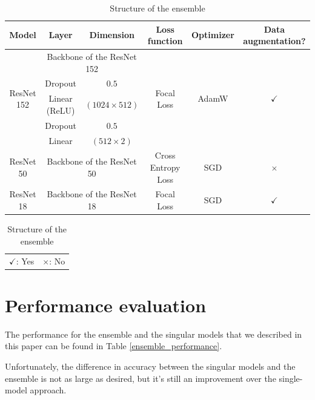\documentclass[11pt, journal]{IEEEtran}
\newcommand{\nl}{

\medskip

}
\begin{document}
\begin{table}[h!]
    \renewcommand{\arraystretch}{1.3}
    \caption{Structure of the ensemble}
    \label{ensemble_specs}
    \centering
    \begin{tabular}{|c|c|c|c|c|c|}
        \hline
        \textbf{Model} & \textbf{Layer} & \textbf{Dimension} & \textbf{Loss function} & \textbf{Optimizer} & \textbf{Data augmentation?} \\
        \hline
        \hline
        \multirow{5}{*}{ResNet 152} & \multicolumn{2}{c|}{Backbone of the ResNet 152} & \multirow{5}{*}{Focal Loss} & \multirow{5}{*}{AdamW} & \multirow{5}{*}{$\checkmark$}
        \\ \cline{2-3} 
        & Dropout & $0.5$ & & &
        \\
        & Linear (ReLU) & $(1024 \times 512)$ & & &
        \\
        & Dropout & $0.5$ & & &
        \\
        & Linear & $(512 \times 2)$ & & &
        \\
        \hline\hline
        \multirow{1}{*}{ResNet 50} & \multicolumn{2}{c|}{Backbone of the ResNet 50} & \multirow{1}{*}{Cross Entropy Loss} & \multirow{1}{*}{SGD} & \multirow{1}{*}{$\times$}
        \\
        \hline \hline
        \multirow{1}{*}{ResNet 18} & \multicolumn{2}{c|}{Backbone of the ResNet 18} & \multirow{1}{*}{Focal Loss} & \multirow{1}{*}{SGD} & \multirow{1}{*}{$\checkmark$}
        \\
        \hline
    \end{tabular}
    \nl
    \begin{tabular}{c c}
        $\checkmark$: Yes & $\times$: No 
    \end{tabular}
\end{table}

\pagebreak

\section{Performance evaluation}

The performance for the ensemble and the singular models that we described in this paper can be found in Table \ref{ensemble_performance}.
\nl
Unfortunately, the difference in accuracy between the singular models and the ensemble is not as large as desired, but it's still an improvement over the single-model approach.
\end{document}
